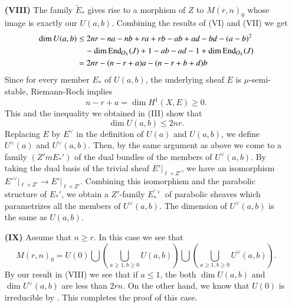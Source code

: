 \begin{itemize}
\item[\bf(VIII)] The family $\tilde{E}_{*}$ gives rise to a morphism of $Z$ to $M(r, n)_{0}$ whose image is exactly our $U(a,b)$. Combining the results of (VI) and (VII) we get
{\small
\begin{equation*}
\begin{split}
\dim U(a, b) &\leq 2nr -na -nb + ra + rb -ab +ad-bd-(a-b)^{2}\\
             & \quad -\dim \operatorname{End}_{\mathcal{O}_{X}}(J) + 1 -ab -ad -1 + \dim \operatorname{End}_{\mathcal{O}_{X}}(J)\\
             &= 2nr -(n-r +a)a-(n-r +b + d)b 
\end{split}
\end{equation*}}\relax
Since for every member $E_{*}$ of $U(a, b)$, the underlying sheaf $E$ is $\mu$-semi-stable, Riemann-Roch implies
$$
n-r + a = \dim H^{1}(X, E) \geq 0.
$$
This and the inequality we obtained in (III) show that
$$
\dim U(a, b) \leq 2nr.
$$
Replacing $E$ by $E^{\vee}$ in the definition of $U(a)$ and $U(a, b)$, we  define $U^{\vee}(a)$ and $U^{\vee}(a, b)$. Then, by the same argument as above we come to a family $(Z'm E_{*}')$ of the dual bundles of the members of $U^{\vee}(a, b)$. By taking the dual basis of the trivial sheaf $E'|_{\ell \times Z'}$, we have an isomorphism $E'^{\vee}|_{\ell \times Z'} \rightarrow E'|_{\ell \times Z'}$. Combining this isomorphism and the parabolic structure of $E_{*}'$, we obtain a $Z'$-family $E_{*}^{'\vee}$ of parabolic sheaves which parametrizes all the members of $U^{\vee}(a, b)$. The dimension of $U^{\vee}(a, b)$ is the same as $U(a, b)$.

\item [\bf(IX)] Assume that $n \geq r$. In this case we see that
$$
M(r, n)_{0} = U(0)\bigcup\left(\bigcup\limits_{a \geq 1, b \geq 0} U(a, b)\right) \bigcup \left(\bigcup\limits_{a \geq 1, b \geq 0} U^{\vee}(a, b)\right).
$$
By our result in (VIII) we see that if $a \leq 1$, the both $\dim U(a, b)$ and $\dim U^{\vee}(a,b)$ are less than $2rn$. On the other hand, we know that $U(0)$ is irreducible by \cite{art12-key3}. This completes the proof of this case.

\newpage


\end{itemize}
